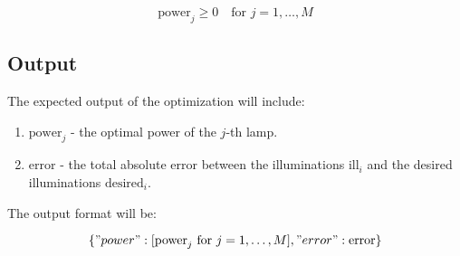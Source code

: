 \documentclass{article}
\begin{document}
\[
\text{power}_j \geq 0 \quad \text{for } j = 1, \ldots, M
\]

\subsection*{Output}
The expected output of the optimization will include:

\begin{enumerate}
    \item \( \text{power}_j \) - the optimal power of the \( j \)-th lamp.
    \item \( \text{error} \) - the total absolute error between the illuminations \( \text{ill}_i \) and the desired illuminations \( \text{desired}_i \).
\end{enumerate}

The output format will be:

\[
\{
    "power": [\text{power}_j \text{ for } j = 1, \ldots, M],
    "error": \text{error}
\}
\]
\end{document}
